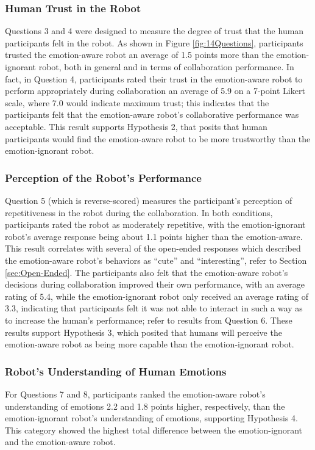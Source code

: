 \documentclass{sig-alternate-05-2015}
\begin{document}
\vspace*{-2mm}
\subsubsection{Human Trust in the Robot}
\label{sec:Trust}
Questions 3 and 4 were designed to measure the degree of trust that the human
participants felt in the robot. As shown in Figure \ref{fig:14Questions},
participants trusted the emotion-aware robot an average of 1.5 points more than
the emotion-ignorant robot, both in general and in terms of collaboration
performance. In fact, in Question 4, participants rated their trust in the
emotion-aware robot to perform appropriately during collaboration an average of
5.9 on a 7-point Likert scale, where 7.0 would indicate maximum trust; this
indicates that the participants felt that the emotion-aware robot's
collaborative performance was acceptable. This result supports Hypothesis 2,
that posits that human participants would find the emotion-aware robot to be
more trustworthy than the emotion-ignorant robot.

\vspace*{-2mm}
\subsubsection{Perception of the Robot's Performance} 
\label{sec:Performance}
Question 5 (which is reverse-scored) measures the participant's perception of
repetitiveness in the robot during the collaboration. In both conditions,
participants rated the robot as moderately repetitive, with the emotion-ignorant
robot's average response being about 1.1 points higher than the emotion-aware.
This result correlates with several of the open-ended responses which described
the emotion-aware robot's behaviors as ``cute'' and ``interesting'', refer to
Section \ref{sec:Open-Ended}. The participants also felt that the emotion-aware
robot's decisions during collaboration improved their own performance, with an
average rating of 5.4, while the emotion-ignorant robot only received an average
rating of 3.3, indicating that participants felt it was not able to interact in
such a way as to increase the human's performance; refer to results from
Question 6. These results support Hypothesis 3, which posited that humans will
perceive the emotion-aware robot as being more capable than the emotion-ignorant
robot.

\subsubsection{Robot's Understanding of Human Emotions} 
\label{sec:Emotions}
For Questions 7 and 8, participants ranked the emotion-aware robot's
understanding of emotions 2.2 and 1.8 points higher, respectively, than the
emotion-ignorant robot's understanding of emotions, supporting Hypothesis 4.
This category showed the highest total difference between the emotion-ignorant
and the emotion-aware robot.
\end{document}
